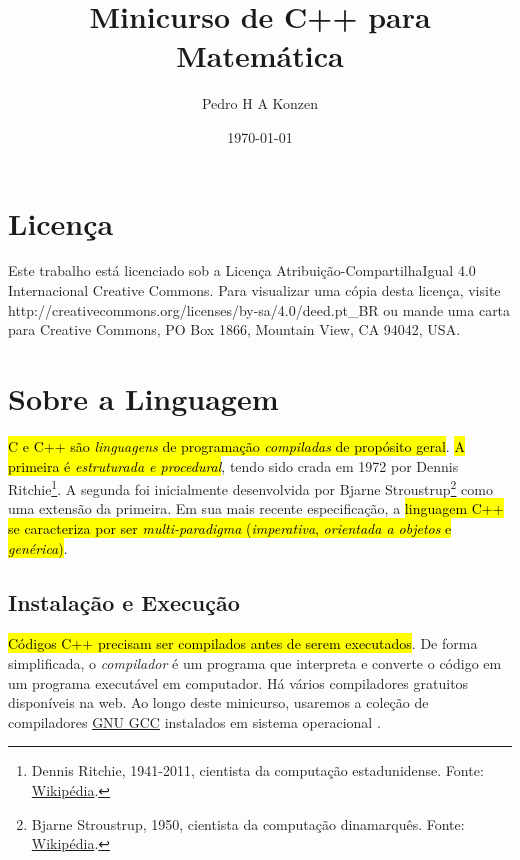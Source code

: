 \documentclass[12pt]{article}
\begin{document}
\title{Minicurso de C++ para Matemática}
\author{Pedro H A Konzen}
\date{\today}

\maketitle

\nocite{}

\tableofcontents

\section{Licença}\label{sec_licenca}

Este trabalho está licenciado sob a Licença Atribuição-CompartilhaIgual 4.0 Internacional Creative Commons. Para visualizar uma cópia desta licença, visite http://creativecommons.org/licenses/by-sa/4.0/deed.pt\_BR ou mande uma carta para Creative Commons, PO Box 1866, Mountain View, CA 94042, USA.


\section{Sobre a Linguagem}\label{sec_sobrepy}

\hl{C e C++ são \emph{linguagens} de programação \emph{compiladas} de propósito geral}. \hl{A primeira é \emph{estruturada e procedural}}, tendo sido crada em 1972 por Dennis Ritchie\footnote{Dennis Ritchie, 1941-2011, cientista da computação estadunidense. Fonte: \href{https://pt.wikipedia.org/wiki/Dennis_Ritchie}{Wikipédia}.}. A segunda foi inicialmente desenvolvida por Bjarne Stroustrup\footnote{Bjarne Stroustrup, 1950, cientista da computação dinamarquês. Fonte: \href{https://pt.wikipedia.org/wiki/Bjarne_Stroustrup}{Wikipédia}.} como uma extensão da primeira. Em sua mais recente especificação, a \hl{linguagem C++ se caracteriza por ser \emph{multi-paradigma} (\emph{imperativa}, \emph{orientada a objetos} e \emph{genérica})}.

\subsection{Instalação e Execução}

\hl{Códigos C++ precisam ser compilados antes de serem executados}. De forma simplificada, o \emph{compilador} é um programa que interpreta e converte o código em um programa executável em computador. Há vários compiladores gratuitos disponíveis na web. Ao longo deste minicurso, usaremos a coleção de compiladores \href{https://gcc.gnu.org/}{GNU GCC} instalados em sistema operacional {\linux}.
\end{document}

